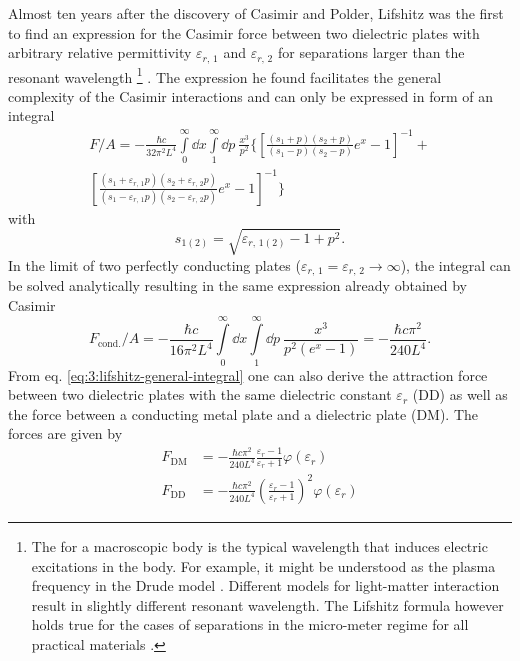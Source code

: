Almost ten years after the discovery of Casimir and Polder, Lifshitz was the first to find an expression for the Casimir force between two dielectric plates with arbitrary relative permittivity $\varepsilon_{r,\,1}$ and $\varepsilon_{r,\,2}$ for separations larger than the resonant wavelength \footnote{The  for a macroscopic body is the typical wavelength that induces electric excitations in the body.  For example,  it might be understood as the plasma frequency in the Drude model \cite{Ford_1998}. Different models for light-matter interaction result in slightly different resonant wavelength. The Lifshitz formula however holds true for the cases of separations in the micro-meter regime for all practical materials \cite{Kamp_2020}.} \cite{Lifshitz_1956}.
The expression he found facilitates the general complexity of the Casimir interactions and can only be expressed in form of an integral \cite{Lifshitz_1956}
\begin{multline}\label{eq:3:lifshitz-general-integral}
  F/A = -\frac{\hbar c}{32 \pi^2 L^4} \int\limits_0^\infty \dd x \int\limits_1^\infty \dd p \ \frac{x^3}{p^2}\biggl\{ \left[ \frac{(s_1+p)(s_2+p)}{(s_1-p)(s_2-p)} e^x - 1 \right]^{-1} + \\
  \left[ \frac{(s_1+ \varepsilon_{r,\,1} p)(s_2 + \varepsilon_{r,\,2} p)}{(s_1 - \varepsilon_{r,\,1} p)(s_2 - \varepsilon_{r,\,2} p)} e^x - 1 \right]^{-1} \biggr\}
\end{multline}
with
\begin{equation*}
  s_{1(2)} = \sqrt{\varepsilon_{r,\,1(2)} - 1 + p^2} .
\end{equation*}
In the limit of two perfectly conducting plates ($\varepsilon_{r,\,1} = \varepsilon_{r,\,2} \rightarrow \infty$), the integral can be solved analytically resulting in the same expression already obtained by Casimir
\begin{equation}
  F_\mathrm{cond.}/A = -\frac{\hbar c}{16 \pi^2 L^4} \int\limits_0^\infty \dd x \int\limits_1^\infty \dd p \ \frac{x^3}{p^2 (e^x - 1)} = -\frac{\hbar c \pi^2}{240 L^4} .
\end{equation}
From eq. \eqref{eq:3:lifshitz-general-integral} one can also derive the attraction force between two dielectric plates with the same dielectric constant $\varepsilon_r$ (DD) as well as the force between a conducting metal plate and a dielectric plate (DM). The forces are given by
\begin{align} \label{eq:3:casimir-pp-F-DM-lifshitz}
  F_\mathrm{DM} &= -\frac{\hbar c \pi^2}{240 L^4} \frac{\varepsilon_r - 1}{\varepsilon_r + 1} \varphi(\varepsilon_r) \\
  F_\mathrm{DD} &= -\frac{\hbar c \pi^2}{240 L^4} \left( \frac{\varepsilon_r - 1}{\varepsilon_r + 1} \right)^2 \varphi(\varepsilon_r)\label{eq:3:casimir-pp-F-DD-lifshitz}
\end{align}
